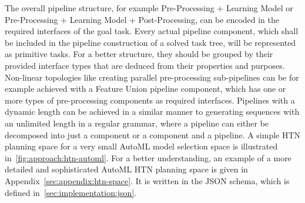 The overall pipeline structure, for example Pre-Processing + Learning Model or Pre-Processing + Learning Model + Post-Processing, can be encoded in the required interfaces of the goal task.
Every actual pipeline component, which shall be included in the pipeline construction of a solved task tree, will be represented as primitive tasks.
For a better structure, they should be grouped by their provided interface types that are deduced from their properties and purposes.\newline
Non-linear topologies like creating parallel pre-processing sub-pipelines can be for example achieved with a Feature Union pipeline component, which has one or more types of pre-processing components as required interfaces.
Pipelines with a dynamic length can be achieved in a similar manner to generating sequences with an unlimited length in a regular grammar, where a pipeline can either be decomposed into just a component or a component and a pipeline.\newline
A simple HTN planning space for a very small AutoML model selection space is illustrated in~\ref{fig:approach:htn-automl}.
For a better understanding, an example of a more detailed and sophisticated AutoML HTN planning space is given in Appendix~\ref{sec:appendix:htn-space}.
It is written in the JSON schema, which is defined in~\ref{sec:implementation:json}.
